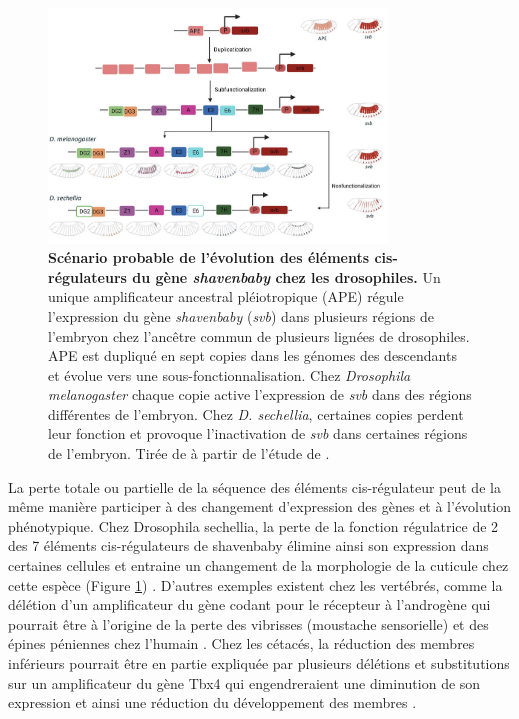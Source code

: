 \begin{figure}[h]
    \centering
    \includegraphics[width=0.8\textwidth, page=1] {figures/introduction/fig33.png}
    \caption[Scénario probable de l'évolution des éléments \gls{cis}-régulateurs du gène \textit{shavenbaby} chez les drosophiles.]{
    \textbf{Scénario probable de l'évolution des éléments \gls{cis}-régulateurs du gène \textit{shavenbaby} chez les drosophiles.}
    Un unique amplificateur ancestral pléiotropique (APE) régule l'expression du gène \textit{shavenbaby} (\textit{svb}) dans plusieurs régions de l'embryon chez l'ancêtre commun de plusieurs lignées de drosophiles. APE est dupliqué en sept copies dans les génomes des descendants et évolue vers une sous-fonctionnalisation. Chez \textit{Drosophila melanogaster} chaque copie active l'expression de \textit{svb} dans des régions différentes de l'embryon. Chez \textit{D. sechellia}, certaines copies perdent leur fonction et provoque l'inactivation de \textit{svb} dans certaines régions de l'embryon. Tirée de \citep{murugesan_evolution_2022} à partir de l'étude de \citep{kittelmann_complex_2021}.\\
    }
    \label{fig:Fig33}
\end{figure}

La perte totale ou partielle de la séquence des éléments \gls{cis}-régulateur peut de la même manière participer à des changement d’expression des gènes et à l’évolution phénotypique. Chez Drosophila sechellia, la perte de la fonction régulatrice de 2 des 7 éléments \gls{cis}-régulateurs de shavenbaby élimine ainsi son expression dans certaines cellules et entraine un changement de la morphologie de la cuticule chez cette espèce (Figure \ref{fig:Fig33}) \citep{kittelmann_complex_2021}. D’autres exemples existent chez les vertébrés, comme la délétion d’un \gls{amplificateur} du gène codant pour le récepteur à l’androgène qui pourrait être à l’origine de la perte des vibrisses (moustache sensorielle) et des épines péniennes chez l’humain \citep{mclean_human-specific_2011}. Chez les cétacés, la réduction des membres inférieurs pourrait être en partie expliquée par plusieurs délétions et substitutions sur un \gls{amplificateur} du gène Tbx4 qui engendreraient une diminution de son expression et ainsi une réduction du développement des membres \citep{liang_divergence_2022}. \\


